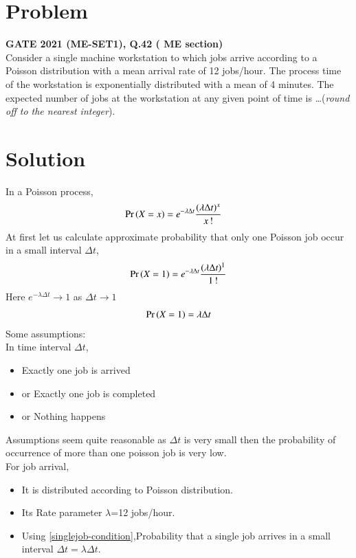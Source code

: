 \documentclass[journal,12pt,twocolumn]{IEEEtran}
\begin{document}
\section{Problem}
\textbf{GATE 2021 (ME-SET1), Q.42 ( ME section)}\\  
   Consider a single machine workstation to which jobs arrive according to a
Poisson distribution with a mean arrival rate of 12 jobs/hour. The process
time of the workstation is exponentially distributed with a mean of 4
minutes. The expected number of jobs at the workstation at any given
point of time is \ldots (\textit{round off to the nearest integer}).
\section{Solution}
In a Poisson process,
 \begin{align}
          \Pr\left(X=x\right)&= e^{-\lambda \Delta t} \frac{(\lambda \Delta t)^{x}}{x\,!}
 \end{align}
At first let us calculate approximate probability that only one Poisson job occur in  a  small interval $\Delta t$,
 \begin{align}
         \Pr\left(X=1\right)= e^{-\lambda \Delta t} \frac{(\lambda \Delta t)^{1}}{1\,!}
 \end{align}
 Here $e^{-\lambda \Delta t}\rightarrow 1$ as $\Delta t \rightarrow 1$
  \begin{align}
         \Pr\left(X=1\right)=\lambda \Delta t \label{singlejob-condition}
 \end{align}
 Some assumptions:\\
 In time interval $\Delta t$,
 \begin{itemize}
     \item Exactly one job is arrived  
     \item or Exactly one job is completed
     \item or Nothing happens
 \end{itemize}
Assumptions seem quite reasonable as $\Delta t$ is very small then the probability of occurrence of more than one poisson job is very low.\\
 For job arrival,
 \begin{itemize}
 \item It is distributed according to Poisson distribution.
     \item Its
 Rate parameter $\lambda $=12 jobs/hour.
 \item Using \eqref{singlejob-condition},Probability that a single job arrives in a small interval $\Delta t=\lambda\Delta t$.
 \end{itemize}
\end{document}
